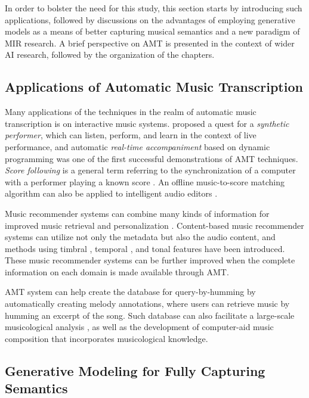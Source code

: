 In order to bolster the need for this study, this section starts by introducing such applications, followed by discussions on the advantages of employing generative models as a means of better capturing musical semantics and a new paradigm of MIR research.
A brief perspective on AMT is presented in the context of wider AI research, followed by the organization of the chapters.


\subsection{Applications of Automatic Music Transcription}\label{sec:applications}

Many applications of the techniques in the realm of automatic music transcription is on interactive music systems.
 proposed a quest for a \emph{synthetic performer}, which can listen, perform, and learn in the context of live performance, and automatic \emph{real-time accompaniment} \cite{dannenberg1985accompaniment} based on dynamic programming was one of the first successful demonstrations of AMT techniques.
\emph{Score following} is a general term referring to the synchronization of a computer with a performer playing a known score \cite{orio2003following}.
An offline music-to-score matching algorithm can also be applied to intelligent audio editors \cite{dannenberg2003following}.

Music recommender systems can combine many kinds of information for improved music retrieval and personalization \cite{celma2010music}.
Content-based music recommender systems can utilize not only the metadata but also the audio content, and methods using timbral \cite{magno2008recommendation}, temporal \cite{li2007recommender}, and tonal features \cite{lu2009recommendation} have been introduced.
These music recommender systems can be further improved when the complete information on each domain is made available through AMT.

AMT system can help create the database for query-by-humming \cite{ghias1995humming} by automatically creating melody annotations, where users can retrieve music by humming an excerpt of the song.
Such database can also facilitate a large-scale musicological analysis \cite{abdallah2015british}, as well as the development of computer-aid music composition \cite{agostini2013aid} that incorporates musicological knowledge.


\subsection{Generative Modeling for Fully Capturing Semantics}

